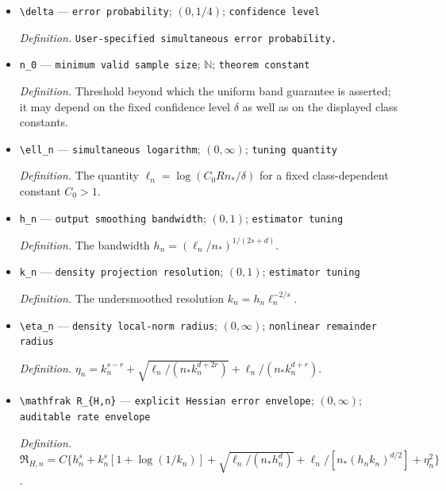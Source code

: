 \documentclass{article}
\begin{document}
\begin{itemize}
  \par\smallskip\noindent\emph{Definition.} The minimum regime sample size \(n_\ast=\min_{p\in\mathcal A}n_p\).
  \item \texttt{\textbackslash{}\allowbreak{}delta} --- \texttt{error probability}; \((0,1/4)\); \texttt{confidence level}
  \par\smallskip\noindent\emph{Definition.} \texttt{User-\allowbreak{}specified simultaneous error probability.}
  \item \texttt{n\_\allowbreak{}0} --- \texttt{minimum valid sample size}; \(\mathbb N\); \texttt{theorem constant}
  \par\smallskip\noindent\emph{Definition.} Threshold beyond which the uniform band guarantee is asserted; it may depend on the fixed confidence level \(\delta\) as well as on the displayed class constants.
  \item \texttt{\textbackslash{}\allowbreak{}ell\_\allowbreak{}n} --- \texttt{simultaneous logarithm}; \((0,\infty)\); \texttt{tuning quantity}
  \par\smallskip\noindent\emph{Definition.} The quantity \(\ell_n=\log(C_0Rn_\ast/\delta)\) for a fixed class-dependent constant \(C_0>1\).
  \item \texttt{h\_\allowbreak{}n} --- \texttt{output smoothing bandwidth}; \((0,1)\); \texttt{estimator tuning}
  \par\smallskip\noindent\emph{Definition.} The bandwidth \(h_n=(\ell_n/n_\ast)^{1/(2s+d)}\).
  \item \texttt{k\_\allowbreak{}n} --- \texttt{density projection resolution}; \((0,1)\); \texttt{estimator tuning}
  \par\smallskip\noindent\emph{Definition.} The undersmoothed resolution \(k_n=h_n\ell_n^{-2/s}\).
  \item \texttt{\textbackslash{}\allowbreak{}eta\_\allowbreak{}n} --- \texttt{density local-\allowbreak{}norm radius}; \((0,\infty)\); \texttt{nonlinear remainder radius}
  \par\smallskip\noindent\emph{Definition.} \(\eta_n=k_n^{s-r}+\sqrt{\ell_n/(n_\ast k_n^{d+2r})}+\ell_n/(n_\ast k_n^{d+r})\).
  \item \texttt{\textbackslash{}\allowbreak{}mathfrak R\_\allowbreak{}\{H,\allowbreak{}n\}\allowbreak{}} --- \texttt{explicit Hessian error envelope}; \((0,\infty)\); \texttt{auditable rate envelope}
  \par\smallskip\noindent\emph{Definition.} \(\mathfrak R_{H,n}=C\{h_n^s+k_n^s[1+\log(1/k_n)]+\sqrt{\ell_n/(n_\ast h_n^d)}+\ell_n/[n_\ast(h_nk_n)^{d/2}]+\eta_n^2\}\).

\end{itemize}
\end{document}
